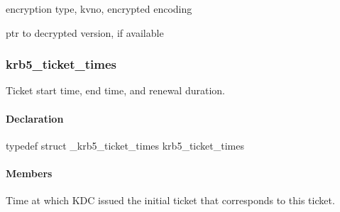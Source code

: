 \documentclass[letterpaper,10pt,english]{sphinxmanual}
\begin{document}

\begin{fulllineitems}
\label{appdev/refs/types/krb5_ticket:krb5_ticket.enc_part}
encryption type, kvno, encrypted encoding

\end{fulllineitems}


\begin{fulllineitems}
\label{appdev/refs/types/krb5_ticket:krb5_ticket.enc_part2}
ptr to decrypted version, if available

\end{fulllineitems}



\subsubsection{krb5\_ticket\_times}
\label{appdev/refs/types/krb5_ticket_times:krb5-ticket-times}\label{appdev/refs/types/krb5_ticket_times:krb5-ticket-times-struct}\label{appdev/refs/types/krb5_ticket_times::doc}

\begin{fulllineitems}
\label{appdev/refs/types/krb5_ticket_times:krb5_ticket_times}
\end{fulllineitems}


Ticket start time, end time, and renewal duration.


\paragraph{Declaration}
\label{appdev/refs/types/krb5_ticket_times:declaration}
typedef struct \_krb5\_ticket\_times  krb5\_ticket\_times


\paragraph{Members}
\label{appdev/refs/types/krb5_ticket_times:members}

\begin{fulllineitems}
\label{appdev/refs/types/krb5_ticket_times:krb5_ticket_times.authtime}
Time at which KDC issued the initial ticket that corresponds to this ticket.

\end{fulllineitems}
\end{document}
